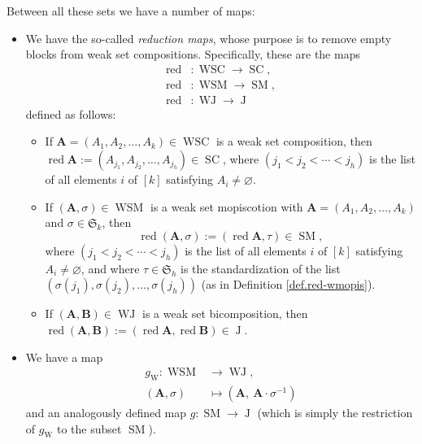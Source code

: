 \documentclass[numbers=enddot,12pt,final,onecolumn,notitlepage]{scrartcl}%
\theoremstyle{definition}
\begin{document}
Between all these sets we have a number of maps:

\begin{itemize}
\item We have the so-called \emph{reduction maps}, whose purpose is to remove
empty blocks from weak set compositions. Specifically, these are the maps%
\begin{align*}
\operatorname*{red}  &  :\operatorname*{WSC}\rightarrow\operatorname*{SC},\\
\operatorname*{red}  &  :\operatorname*{WSM}\rightarrow\operatorname*{SM},\\
\operatorname*{red}  &  :\operatorname*{WJ}\rightarrow\operatorname*{J}%
\end{align*}
defined as follows:

\begin{itemize}
\item If $\mathbf{A}=\left(  A_{1},A_{2},\ldots,A_{k}\right)  \in
\operatorname*{WSC}$ is a weak set composition, then $\operatorname*{red}%
\mathbf{A}:=\left(  A_{j_{1}},A_{j_{2}},\ldots,A_{j_{h}}\right)
\in\operatorname*{SC}$, where $\left(  j_{1}<j_{2}<\cdots<j_{h}\right)  $ is
the list of all elements $i$ of $\left[  k\right]  $ satisfying $A_{i}%
\neq\varnothing$.

\item If $\left(  \mathbf{A},\sigma\right)  \in\operatorname*{WSM}$ is a weak
set mopiscotion with $\mathbf{A}=\left(  A_{1},A_{2},\ldots,A_{k}\right)  $
and $\sigma\in\mathfrak{S}_{k}$, then
\[
\operatorname*{red}\left(  \mathbf{A},\sigma\right)  :=\left(
\operatorname*{red}\mathbf{A},\tau\right)  \in\operatorname*{SM},
\]
where $\left(  j_{1}<j_{2}<\cdots<j_{h}\right)  $ is the list of all elements
$i$ of $\left[  k\right]  $ satisfying $A_{i}\neq\varnothing$, and where
$\tau\in\mathfrak{S}_{h}$ is the standardization of the list $\left(
\sigma\left(  j_{1}\right)  ,\sigma\left(  j_{2}\right)  ,\ldots,\sigma\left(
j_{h}\right)  \right)  $ (as in Definition \ref{def.red-wmopis}).

\item If $\left(  \mathbf{A},\mathbf{B}\right)  \in\operatorname*{WJ}$ is a
weak set bicomposition, then $\operatorname*{red}\left(  \mathbf{A}%
,\mathbf{B}\right)  :=\left(  \operatorname*{red}\mathbf{A}%
,\operatorname*{red}\mathbf{B}\right)  \in\operatorname*{J}$.
\end{itemize}

\item We have a map
\begin{align*}
g_{\operatorname*{W}}:\operatorname*{WSM}  &  \rightarrow\operatorname*{WJ},\\
\left(  \mathbf{A},\sigma\right)   &  \mapsto\left(  \mathbf{A},\ \mathbf{A}%
\cdot\sigma^{-1}\right)
\end{align*}
and an analogously defined map $g:\operatorname*{SM}\rightarrow
\operatorname*{J}$ (which is simply the restriction of $g_{\operatorname*{W}}$
to the subset $\operatorname*{SM}$).
\end{itemize}
\end{document}
